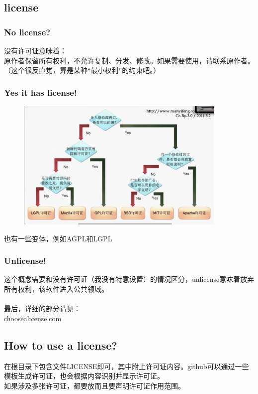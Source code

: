 \documentclass{article}
\begin{document}
\subsection{license}
\subsubsection{No license?}
\noindent
没有许可证意味着：\\
原作者保留所有权利，不允许复制、分发、修改。如果需要使用，请联系原作者。（这个很反直觉，算是某种“最小权利”的约束吧。）
\subsubsection{Yes it has license!}
\noindent
\begin{figure}[h]
    \centering
    \includegraphics[width=0.9\textwidth]{pic2_license.png}
\end{figure}
也有一些变体，例如AGPL和LGPL
\subsubsection{Unlicense!}
\noindent
这个概念需要和没有许可证（我没有特意设置）的情况区分，unlicense意味着放弃所有权利，该软件进入公共领域。\\
\\
最后，详细的部分请见：\\
choosealicense.com
\subsection{How to use a license?}
\noindent
在根目录下包含文件LICENSE即可，其中附上许可证内容。github可以通过一些模板生成许可证，也会根据内容识别并显示许可证。\\
如果涉及多张许可证，都要放而且要声明许可证作用范围。\\
\end{document}
